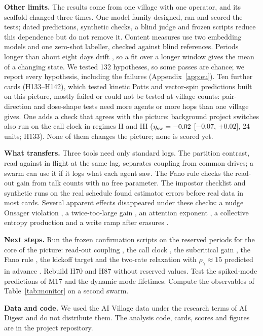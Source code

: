 \textbf{Other limits.} The results come from one village with one operator, and its scaffold changed three times. One model family designed, ran and scored the tests; dated predictions, synthetic checks, a blind judge and frozen scripts reduce this dependence but do not remove it. Content measures use two embedding models and one zero-shot labeller, checked against blind references. Periods longer than about eight days drift , so a fit over a longer window gives the mean of a changing state. We tested 132 hypotheses, so some passes are chance; we report every hypothesis, including the failures (Appendix~\ref{app:eu}). Ten further cards (H133--H142), which tested kinetic Potts and vector-spin predictions built on this picture, mostly failed or could not be tested at village counts: pair-direction and dose-shape tests need more agents or more hops than one village gives. One adds a check that agrees with the picture: background project switches also run on the call clock in regimes II and III ($\eta_{\rm sw}=-0.02$ [$-0.07$, $+0.02$], 24 units; H133). None of them changes the picture; none is scored yet.

\textbf{What transfers.} Three tools need only standard logs. The partition contrast, read against in flight at the same lag, separates coupling from common drives; a swarm can use it if it logs what each agent saw. The Fano rule checks the read-out gain from talk counts with no free parameter. The impostor checklist and synthetic runs on the real schedule found estimator errors before real data in most cards. Several apparent effects disappeared under these checks: a nudge Onsager violation , a twice-too-large gain , an attention exponent , a collective entropy production  and a write ramp after erasures .

\textbf{Next steps.} Run the frozen confirmation scripts on the reserved periods for the core of the picture: read-out coupling , the call clock , the subcritical gain , the Fano rule , the kickoff target  and the two-rate relaxation with $\rho_\gamma\approx15$ predicted in advance . Rebuild H70 and H87 without reserved values. Test the spiked-mode predictions of M17 and the dynamic mode lifetimes. Compute the observables of Table~\ref{tab:monitor} on a second swarm.

\textbf{Data and code.} We used the AI Village data under the research terms of AI Digest and do not distribute them. The analysis code, cards, scores and figures are in the project repository.
